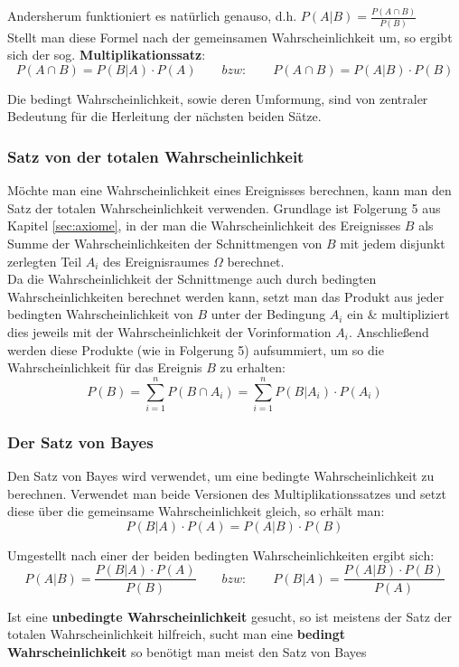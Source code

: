 \documentclass[a4paper]{article}
\newcommand\dangersign{%
 \makebox[1.8em][c]{%
 \makebox[0pt][c]{\raisebox{.15em}{\small!}}%
 \makebox[0pt][c]{\color{red}\Large$\triangle$}}}%
\begin{document}
\noindent \dangersign Andersherum funktioniert es natürlich genauso, d.h. $P(A|B) = \frac{P(A \cap B)}{P(B)}$\\

\noindent Stellt man diese Formel nach der gemeinsamen Wahrscheinlichkeit um, so ergibt sich der sog. \textbf{Multiplikationssatz}:
$$P(A \cap B) = P(B|A) \cdot P(A) \qquad bzw: \qquad P(A \cap B) = P(A|B) \cdot P(B)$$

\noindent Die bedingt Wahrscheinlichkeit, sowie deren Umformung, sind von zentraler Bedeutung für die Herleitung der nächsten beiden Sätze.

\subsubsection{Satz von der totalen Wahrscheinlichkeit}\label{sec:tot-wkeit}
Möchte man eine Wahrscheinlichkeit eines Ereignisses berechnen, kann man den Satz der totalen Wahrscheinlichkeit verwenden. Grundlage ist Folgerung 5 aus Kapitel \ref{sec:axiome}, in der man die Wahrscheinlichkeit des Ereignisses $B$ als Summe der Wahrscheinlichkeiten der Schnittmengen von $B$ mit jedem disjunkt zerlegten Teil $A_i$ des Ereignisraumes $\Omega$ berechnet.\\
Da die Wahrscheinlichkeit der Schnittmenge auch durch bedingten Wahrscheinlichkeiten berechnet werden kann, setzt man das Produkt aus jeder bedingten Wahrscheinlichkeit von $B$ unter der Bedingung $A_i$ ein \& multipliziert dies jeweils mit der Wahrscheinlichkeit der Vorinformation $A_i$. Anschließend werden diese Produkte (wie in Folgerung 5) aufsummiert, um so die Wahrscheinlichkeit für das Ereignis $B$ zu erhalten:
$$P(B) = \sum_{i=1}^n P(B \cap A_i) = \sum_{i=1}^n P(B|A_i) \cdot P(A_i)$$

\subsubsection{Der Satz von Bayes}\label{sec:bayes}
Den Satz von Bayes wird verwendet, um eine bedingte Wahrscheinlichkeit zu berechnen. Verwendet man beide Versionen des Multiplikationssatzes und setzt diese über die gemeinsame Wahrscheinlichkeit gleich, so erhält man: 
$$P(B|A) \cdot P(A) = P(A|B) \cdot P(B)$$

\noindent Umgestellt nach einer der beiden bedingten Wahrscheinlichkeiten ergibt sich:
$$ P(A|B) = \frac{P(B|A)\cdot P(A)}{P(B)} \qquad bzw: \qquad P(B|A) = \frac{P(A|B)\cdot P(B)}{P(A)}$$

\noindent \dangersign Ist eine \textbf{unbedingte Wahrscheinlichkeit} gesucht, so ist meistens der Satz der totalen Wahrscheinlichkeit hilfreich, sucht man eine \textbf{bedingt Wahrscheinlichkeit} so benötigt man meist den Satz von Bayes
\end{document}
